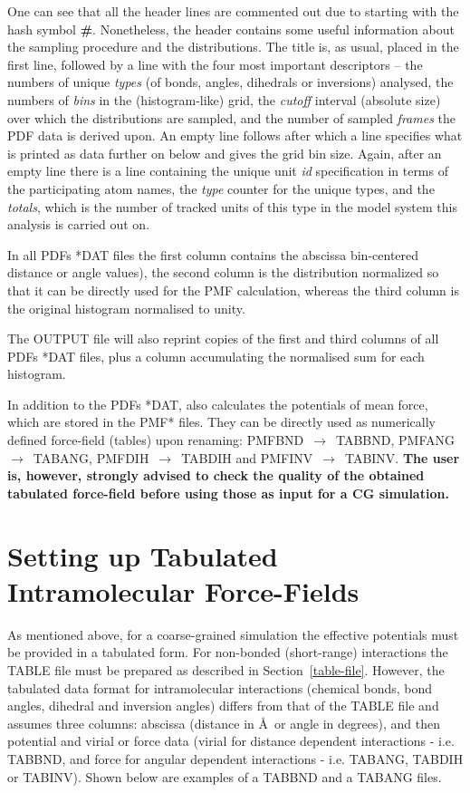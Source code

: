 One can see that all the header lines are commented out due
to starting with the hash symbol {\bf \#}.  Nonetheless, the
header contains some useful information about the sampling
procedure and the distributions.  The title is, as usual,
placed in the first line, followed by a line with the four
most important descriptors -- the numbers of unique {\em types}
(of bonds, angles, dihedrals or inversions) analysed, the
numbers of {\em bins} in the (histogram-like) grid, the
{\em cutoff} interval (absolute size) over which the
distributions are sampled, and the number of sampled
{\em frames} the PDF data is derived upon.  An empty line
follows after which a line specifies what is printed as
data further on below and gives the grid bin size.  Again,
after an empty line there is a line containing the unique
unit {\em id} specification in terms of the participating
atom names, the {\em type} counter for the unique types, and
the {\em totals}, which is the number of tracked units of
this type in the model system this analysis is carried out on.

In all PDFs *DAT files the first column contains the abscissa
bin-centered distance or angle values), the second column
is the distribution normalized so that it can be directly
used for the PMF calculation, whereas the third column is
the original histogram normalised to unity.

The OUTPUT file will also reprint copies of the first and
third columns of all PDFs *DAT files, plus a column
accumulating the normalised sum for each histogram.

In addition to the PDFs *DAT, \D also calculates the
potentials of mean force, which are stored in the PMF*
files.  They can be directly used as numerically defined
force-field (tables) upon renaming: PMFBND~$\to$~TABBND,
PMFANG~$\to$~TABANG, PMFDIH~$\to$~TABDIH and PMFINV~$\to$~TABINV.
{\bf The user is, however, strongly advised to check
the quality of the obtained tabulated force-field before
using those as input for a CG simulation.}

\section{Setting up Tabulated Intramolecular Force-Fields}
\label{bonded-tables}

As mentioned above, for a coarse-grained simulation the
effective potentials must be provided in a tabulated form.
For non-bonded (short-range) interactions the TABLE file
must be prepared as described in Section~\ref{table-file}.
However, the tabulated data format for intramolecular
interactions (chemical bonds, bond angles, dihedral and
inversion angles) differs from that of the TABLE file and
assumes three columns: abscissa (distance in \AA~or angle
in degrees), and then potential and virial or force data
(virial for distance dependent interactions - i.e. TABBND,
and force for angular dependent interactions - i.e. TABANG,
TABDIH or TABINV).  Shown below are examples of a TABBND
and a TABANG files.

